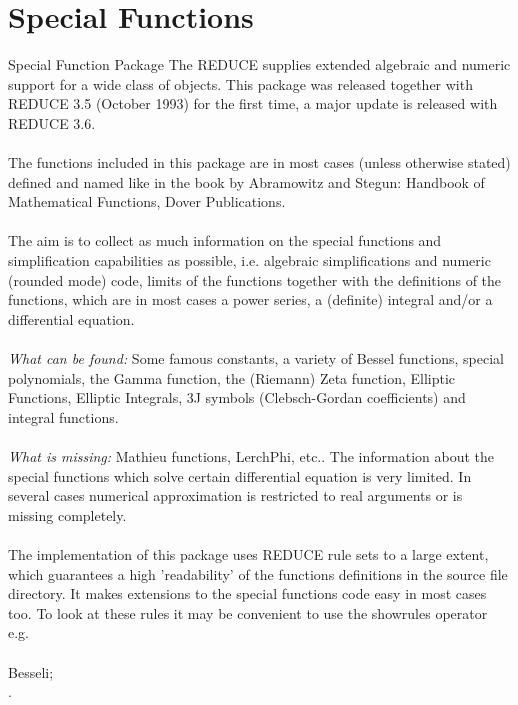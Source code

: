 \newpage
\section{Special Functions}
\begin{Introduction}{Special Function Package}
The REDUCE  supplies extended
algebraic and numeric support for a wide class of objects.
This package was released together with REDUCE 3.5 (October 1993)
for the first time, a major update is released with REDUCE 3.6.\\
\\

The functions included in this package are in most cases (unless otherwise
stated) defined and named like in the book by Abramowitz and Stegun:
Handbook of Mathematical Functions, Dover Publications.\\
 \\

The aim is to collect as much information on the special functions
and simplification capabilities as possible,
i.e. algebraic simplifications and numeric (rounded mode) code, limits
of the functions together
with the definitions of the functions, which are in most cases a power 
series, a (definite) integral and/or a differential equation.\\
 \\

{\em What can be found:} Some famous constants, a variety of Bessel functions,
special polynomials,
the Gamma function, the (Riemann) Zeta function, Elliptic Functions, Elliptic
Integrals, 3J symbols (Clebsch-Gordan coefficients) and integral functions.\\
 \\

{\em What is missing:} Mathieu functions, LerchPhi, etc..
The information about the special functions which solve certain
differential equation is very limited.
In several cases numerical approximation is restricted to real
arguments or is missing completely.\\
 \\

The implementation of this package uses REDUCE rule sets to a large extent,
which guarantees a high 'readability' of the functions definitions in the
source file directory. It makes extensions to the special
functions code easy in most cases too. To look at these rules
it may be convenient to use the showrules operator e.g.\\
 \\
  Besseli;\\
.\\


\end{Introduction}
